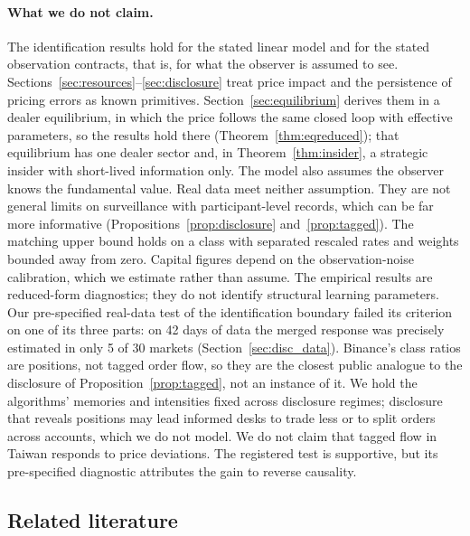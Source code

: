 \documentclass[12pt]{article}
\theoremstyle{definition}
\theoremstyle{remark}
\begin{document}
\paragraph{What we do not claim.} The identification results hold for the stated linear model and for the stated observation contracts, that is, for what the observer is assumed to see. Sections~\ref{sec:resources}--\ref{sec:disclosure} treat price impact and the persistence of pricing errors as known primitives. Section~\ref{sec:equilibrium} derives them in a dealer equilibrium, in which the price follows the same closed loop with effective parameters, so the results hold there (Theorem~\ref{thm:eqreduced}); that equilibrium has one dealer sector and, in Theorem~\ref{thm:insider}, a strategic insider with short-lived information only. The model also assumes the observer knows the fundamental value. Real data meet neither assumption. They are not general limits on surveillance with participant-level records, which can be far more informative (Propositions~\ref{prop:disclosure} and~\ref{prop:tagged}). The matching upper bound holds on a class with separated rescaled rates and weights bounded away from zero. Capital figures depend on the observation-noise calibration, which we estimate rather than assume. The empirical results are reduced-form diagnostics; they do not identify structural learning parameters. Our pre-specified real-data test of the identification boundary failed its criterion on one of its three parts: on 42 days of data the merged response was precisely estimated in only 5 of 30 markets (Section~\ref{sec:disc_data}). Binance's class ratios are positions, not tagged order flow, so they are the closest public analogue to the disclosure of Proposition~\ref{prop:tagged}, not an instance of it. We hold the algorithms' memories and intensities fixed across disclosure regimes; disclosure that reveals positions may lead informed desks to trade less or to split orders across accounts, which we do not model. We do not claim that tagged flow in Taiwan responds to price deviations. The registered test is supportive, but its pre-specified diagnostic attributes the gain to reverse causality.

\subsection{Related literature}\label{sec:lit}
\end{document}
